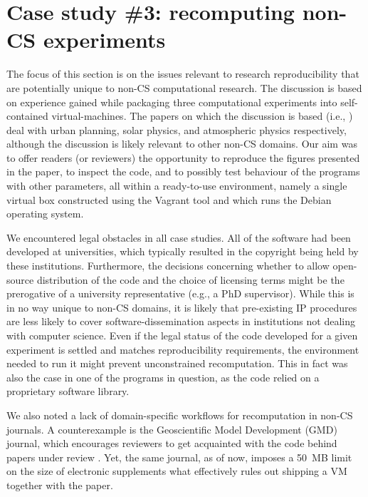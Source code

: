 \section{Case study \#3: recomputing non-CS experiments}
\label{s:group3}

The focus of this section is on the issues relevant to research reproducibility that are potentially unique to non-CS computational research.
The discussion is based on experience gained while packaging three computational experiments into self-contained virtual-machines.
The papers on which the discussion is based (i.e., \cite{danielpaper,bareford2010nanoflare,arabas2013libcloud}) deal with urban planning, solar physics, and atmospheric physics respectively, although the discussion is likely relevant to other non-CS domains.
Our aim was to offer readers (or reviewers) the opportunity to reproduce the figures presented in the paper, to inspect the code, and to possibly test behaviour of the programs with other parameters, all within a ready-to-use environment, namely a single virtual box constructed using the Vagrant tool and which runs the Debian operating system.

%
We encountered legal obstacles in all case studies.
All of the software had been developed at universities, which typically resulted in the copyright being held by these institutions.
Furthermore, the decisions concerning whether to allow open-source distribution of the code and the choice of licensing terms might be the prerogative of a university representative (e.g., a PhD supervisor).
While this is in no way unique to non-CS domains, it is likely that pre-existing IP procedures are less likely to cover software-dissemination aspects in institutions not dealing with computer science.
Even if the legal status of the code developed for a given experiment is settled and matches reproducibility requirements, the environment needed to run it might prevent unconstrained recomputation.
This in fact was also the case in one of the programs in question, as the code relied on a proprietary software library.

We also noted a lack of domain-specific workflows for recomputation in non-CS journals.
A counterexample is the Geoscientific Model Development (GMD) journal, which encourages reviewers to get
  acquainted with the code behind papers under review \cite{GMD_editorial_2013}.
Yet, the same journal, as of now, imposes a 50~MB limit on the size of electronic supplements 
  what effectively rules out shipping a VM together with the paper.

